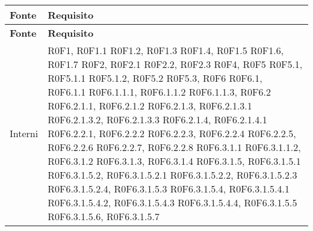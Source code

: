 \def\arraystretch{1.5}
\begin{longtable}{p{2.5cm}!{\VRule[1pt]}p{5.5cm}}
\color{white} \textbf{Fonte} & \color{white} \textbf{Requisito} \\ 
\endfirsthead 
{} 
\color{white} \textbf{Fonte} & \color{white} \textbf{Requisito} \\ 
\endhead 
Interni & R0F1, R0F1.1 \newline
R0F1.2, R0F1.3 \newline
R0F1.4, R0F1.5 \newline
R0F1.6, R0F1.7 \newline
R0F2, R0F2.1 \newline
R0F2.2, R0F2.3 \newline
R0F4, R0F5 \newline
R0F5.1, R0F5.1.1 \newline
R0F5.1.2, R0F5.2 \newline
R0F5.3, R0F6 \newline
R0F6.1, R0F6.1.1 \newline
R0F6.1.1.1, R0F6.1.1.2 \newline
R0F6.1.1.3, R0F6.2 \newline
R0F6.2.1.1, R0F6.2.1.2 \newline
R0F6.2.1.3, R0F6.2.1.3.1 \newline
R0F6.2.1.3.2, R0F6.2.1.3.3 \newline
R0F6.2.1.4, R0F6.2.1.4.1 \newline
R0F6.2.2.1, R0F6.2.2.2 \newline
R0F6.2.2.3, R0F6.2.2.4 \newline
R0F6.2.2.5, R0F6.2.2.6 \newline
R0F6.2.2.7, R0F6.2.2.8 \newline
R0F6.3.1.1 \newline
R0F6.3.1.1.2, R0F6.3.1.2 \newline
R0F6.3.1.3, R0F6.3.1.4 \newline
R0F6.3.1.5, R0F6.3.1.5.1 \newline
R0F6.3.1.5.2, R0F6.3.1.5.2.1 \newline
R0F6.3.1.5.2.2, R0F6.3.1.5.2.3 \newline
R0F6.3.1.5.2.4, R0F6.3.1.5.3 \newline
R0F6.3.1.5.4, R0F6.3.1.5.4.1 \newline
R0F6.3.1.5.4.2, R0F6.3.1.5.4.3 \newline
R0F6.3.1.5.4.4, R0F6.3.1.5.5 \newline
R0F6.3.1.5.6, R0F6.3.1.5.7 \newline

\end{longtable}
